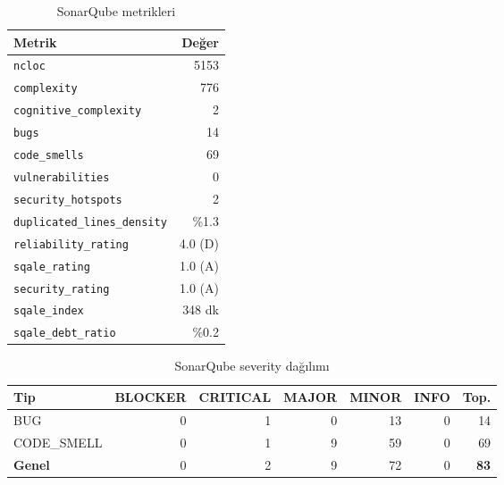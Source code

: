 \documentclass[conference]{IEEEtran}
\begin{document}
\begin{table}[htbp]
\caption{SonarQube metrikleri}
\label{tab:sonar-measures}
\centering
\begin{tabular}{@{}lr@{}}
\toprule
\textbf{Metrik} & \textbf{Değer} \\
\midrule
\texttt{ncloc}                    & 5153 \\
\texttt{complexity}               & 776 \\
\texttt{cognitive\_complexity}    & 2 \\
\texttt{bugs}                     & 14 \\
\texttt{code\_smells}             & 69 \\
\texttt{vulnerabilities}          & 0 \\
\texttt{security\_hotspots}       & 2 \\
\texttt{duplicated\_lines\_density} & \%1.3 \\
\texttt{reliability\_rating}      & 4.0 (D) \\
\texttt{sqale\_rating}            & 1.0 (A) \\
\texttt{security\_rating}         & 1.0 (A) \\
\texttt{sqale\_index}             & 348 dk \\
\texttt{sqale\_debt\_ratio}       & \%0.2 \\
\bottomrule
\end{tabular}
\end{table}

\begin{table}[htbp]
\caption{SonarQube severity dağılımı}
\label{tab:sonar-severity}
\centering
\begin{tabular}{@{}lrrrrrr@{}}
\toprule
\textbf{Tip} & \textbf{BLOCKER} & \textbf{CRITICAL} & \textbf{MAJOR} & \textbf{MINOR} & \textbf{INFO} & \textbf{Top.} \\
\midrule
BUG         & 0 & 1 & 0 & 13 & 0 & 14 \\
CODE\_SMELL & 0 & 1 & 9 & 59 & 0 & 69 \\
\midrule
\textbf{Genel} & 0 & 2 & 9 & 72 & 0 & \textbf{83} \\
\bottomrule
\end{tabular}
\end{table}
\end{document}
